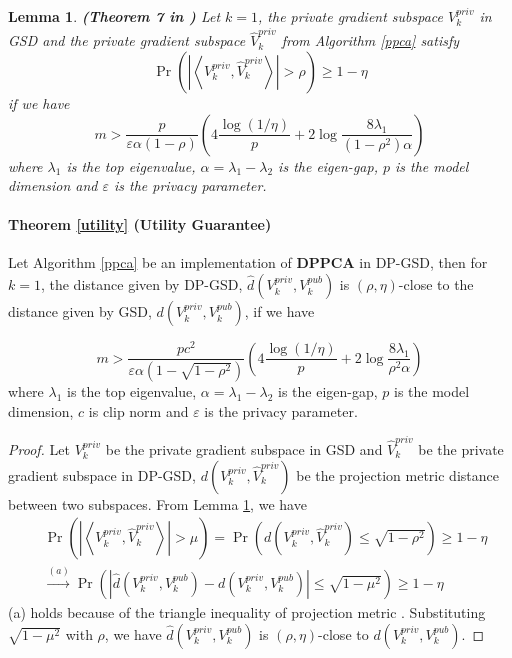 \documentclass[11pt]{article}
\renewcommand{\epsilon}{\varepsilon}
\newtheorem{lemma}{Lemma}
\begin{document}
\begin{lemma}
    \textbf{(Theorem 7 in \cite{dppca1})} Let $k = 1$, the private gradient subspace $V^{priv}_k$ in GSD and the private gradient subspace $\hat{V}^{priv}_k$ from Algorithm \ref{ppca} satisfy 
    \begin{equation}
    \operatorname{Pr}\left(\left|\left\langle V^{priv}_k, \hat{V}^{priv}_k\right\rangle\right|>\rho\right) \geq 1-\eta
    \end{equation} 
    if we have
    \begin{equation}
    m>\frac{p}{\epsilon \alpha(1-\rho)}\left(4 \frac{\log (1 / \eta)}{p}+2 \log \frac{8 \lambda_1}{\left(1-\rho^2\right) \alpha}\right)
    \end{equation}
     where $\lambda_1$ is the top eigenvalue, $\alpha = \lambda_1 - \lambda_2$ is the eigen-gap, $p$ is the model dimension and $\epsilon$ is the privacy parameter.
     \label{theorem7}
\end{lemma}


\paragraph{Theorem \ref{utility} (Utility Guarantee)} Let Algorithm \ref{ppca} be an implementation of $\mathbf{DPPCA}$ in DP-GSD, then for $k = 1$, the distance given by DP-GSD, $\hat{d}(V^{priv}_k, V^{pub}_k)$ is $(\rho, \eta)$-close to the distance given by GSD, $d(V^{priv}_k, V^{pub}_k)$, if we have

    \begin{equation}
        m>\frac{pc^2}{\epsilon \alpha(1-\sqrt{1 - \rho ^ 2})}\left(4 \frac{\log (1 / \eta)}{p}+2 \log \frac{8 \lambda_1}{\rho^2 \alpha}\right)
    \end{equation}
    where $\lambda_1$ is the top eigenvalue, $\alpha = \lambda_1 - \lambda_2$ is the eigen-gap, $p$ is the model dimension, $c$ is clip norm and $\epsilon$ is the privacy parameter.
\begin{proof}
    Let $V^{priv}_k$ be the private gradient subspace in GSD and $\hat{V}^{priv}_k$ be the private gradient subspace in DP-GSD, $d(V^{priv}_k, \hat{V}^{priv}_k)$ be the projection metric distance between two subspaces. From Lemma \ref{theorem7}, we have
    \begin{equation}
    \begin{aligned}
        & \operatorname{Pr}\left(\left|\left\langle V^{priv}_k, \hat{V}^{priv}_k\right\rangle\right|>\mu\right) = \operatorname{Pr}\left( d(V^{priv}_k, \hat{V}^{priv}_k) \le \sqrt{1 - \rho^2}\right) \geq 1-\eta \\
        & \xrightarrow[]{(a)} \operatorname{Pr}\left( \left|\hat{d}(V^{priv}_k, V^{pub}_k) - d(V^{priv}_k, V^{pub}_k)\right| \le \sqrt{1 - \mu^2}\right) \geq 1-\eta
    \end{aligned}
    \end{equation}
    (a) holds because of the triangle inequality of projection metric \cite{projectionmetric}. Substituting $\sqrt{1 - \mu^2}$ with $\rho$, we have $\hat{d}(V^{priv}_k, V^{pub}_k)$ is $(\rho, \eta)$-close to $d(V^{priv}_k, V^{pub}_k)$.
\end{proof}
\end{document}
